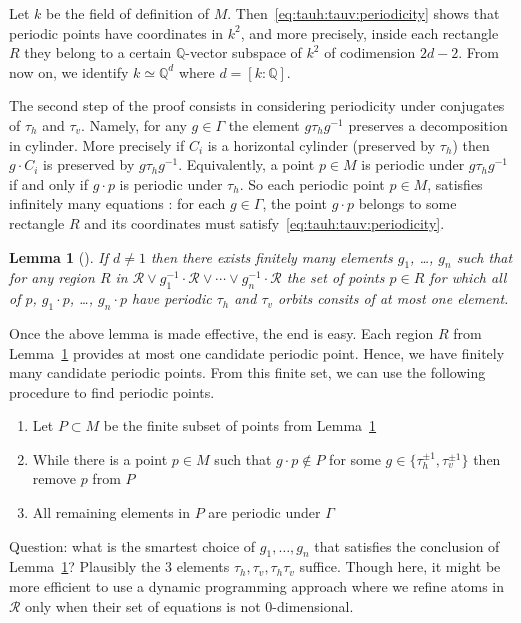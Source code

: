 \documentclass[a4paper,12pt]{article}
\def\bQ{\mathbb{Q}}
\newtheorem{lemma}[definition]{Lemma}
\begin{document}
Let $k$ be the field of definition of $M$. Then~\eqref{eq:tauh:tauv:periodicity}
shows that periodic points have coordinates in $k^2$, and more precisely, inside
each rectangle $R$ they belong to a certain $\bQ$-vector subspace of $k^2$ of
codimension $2d-2$. From now on, we identify $k \simeq \bQ^d$ where $d = [k:\bQ]$.

\smallskip

The second step of the proof consists in considering periodicity under conjugates
of $\tau_h$ and $\tau_v$. Namely, for any $g \in \Gamma$
the element $g \tau_h g^{-1}$ preserves a decomposition in cylinder. More precisely
if $C_i$ is a horizontal cylinder (preserved by $\tau_h$) then $g \cdot C_i$ is preserved
by $g \tau_h g^{-1}$. Equivalently, a point $p \in M$ is periodic under $g \tau_h g^{-1}$
if and only if $g \cdot p$ is periodic under $\tau_h$. So each periodic point $p \in M$,
satisfies infinitely many equations : for each $g \in \Gamma$, the point $g \cdot p$ belongs
to some rectangle $R$ and its coordinates must satisfy~\eqref{eq:tauh:tauv:periodicity}.

\begin{lemma}[\cite{ChowdhuryEverettFreedmanLee}]
\label{lem:finitely:many:g}
If $d\not=1$ then there
exists finitely many elements $g_1$, \ldots, $g_n$ such that
for any region $R$ in $\mathcal{R} \vee g_1^{-1} \cdot \mathcal{R} \vee \cdots \vee g_n^{-1} \cdot \mathcal{R}$
the set of points $p \in R$ for which all of $p$, $g_1 \cdot p$,
\ldots, $g_n \cdot p$ have periodic $\tau_h$ and $\tau_v$ orbits
consits of at most one element.
\end{lemma}

Once the above lemma is made effective, the end is easy. Each region $R$
from Lemma~\ref{lem:finitely:many:g} provides at most one candidate periodic
point. Hence, we have finitely many candidate periodic points. From this
finite set, we can use the following procedure to find periodic points.
\begin{enumerate}
\item Let $P \subset M$ be the finite subset of points from Lemma~\ref{lem:finitely:many:g}
\item While there is a point $p \in M$ such that $g \cdot p \not\in P$ for some
$g \in \{\tau_h^{\pm 1}, \tau_v^{\pm 1}\}$ then remove $p$ from $P$
\item All remaining elements in $P$ are periodic under $\Gamma$
\end{enumerate}

Question: what is the smartest choice of $g_1, \ldots, g_n$ that satisfies
the conclusion of Lemma~\ref{lem:finitely:many:g}? Plausibly the 3 elements
$\tau_h, \tau_v, \tau_h \tau_v$ suffice. Though here, it might be
more efficient to use a dynamic programming approach where we refine
atoms in $\mathcal{R}$ only when their set of equations is not $0$-dimensional.
\end{document}
